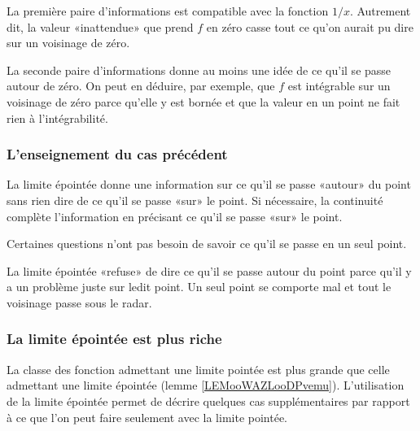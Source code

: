 La première paire d'informations est compatible avec la fonction \( 1/x\). Autrement dit, la valeur «inattendue» que prend \( f\) en zéro casse tout ce qu'on aurait pu dire sur un voisinage de zéro.

La seconde paire d'informations donne au moins une idée de ce qu'il se passe autour de zéro. On peut en déduire, par exemple, que \( f\) est intégrable sur un voisinage de zéro parce qu'elle y est bornée et que la valeur en un point ne fait rien à l'intégrabilité.

\subsubsection{L'enseignement du cas précédent}

La limite épointée donne une information sur ce qu'il se passe «autour» du point sans rien dire de ce qu'il se passe «sur» le point. Si nécessaire, la continuité complète l'information en précisant ce qu'il se passe «sur» le point.

Certaines questions n'ont pas besoin de savoir ce qu'il se passe en un seul point.

La limite épointée «refuse» de dire ce qu'il se passe autour du point parce qu'il y a un problème juste sur ledit point. Un seul point se comporte mal et tout le voisinage passe sous le radar.

\subsubsection{La limite épointée est plus riche}

La classe des fonction admettant une limite pointée est plus grande que celle admettant une limite épointée (lemme \ref{LEMooWAZLooDPvemu}). L'utilisation de la limite épointée permet de décrire quelques cas supplémentaires par rapport à ce que l'on peut faire seulement avec la limite pointée.

